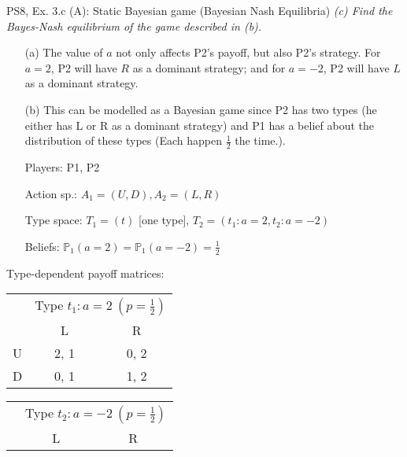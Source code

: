 \begin{frame}{PS8, Ex. 3.c (A): Static Bayesian game (Bayesian Nash Equilibria)}
    \textit{(c) Find the Bayes-Nash equilibrium of the game described in (b).}
    \vspace{-8pt}
    \begin{multicols}{2}
      \begin{itemize}
      \item[(a)] The value of $a$ not only affects P2's payoff, but also P2's strategy. For $a=2$, P2 will have $R$ as a dominant strategy; and for $a=-2$, P2 will have $L$ as a dominant strategy.
      \item[(b)] This can be modelled as a Bayesian game since P2 has two types (he either has L or R as a dominant strategy) and P1 has a belief about the distribution of these types (Each happen $\frac{1}{2}$ the time.).
          \item[Players:] P1, P2
          \item[Action sp.:] $A_1=(U,D),A_2=(L,R)$
          \item[Type space:] $T_1=(t)$ [one type], $T_2=(t_1:a=2,t_2:a=-2)$
          \item[Beliefs:] $\mathbb{P}_1(a=2)=\mathbb{P}_1(a=-2)=\frac{1}{2}$
          \vfill\null\columnbreak
      \end{itemize}
      Type-dependent payoff matrices:
      \vspace{-8pt}
      \begin{table}
          \begin{tabular}{l|c|c|}
          \multicolumn{1}{c}{} & \multicolumn{2}{c}{Type $t_1:a=2\ (p=\frac{1}{2})$} \\
          \multicolumn{1}{c}{} & \multicolumn{1}{c}{L} & \multicolumn{1}{c}{R} \\\cline{2-3}
          U & 2, 1 & 0, 2 \\\cline{2-3}
          D & 0, 1 & 1, 2 \\\cline{2-3}
        \end{tabular}
      \end{table}
      \vspace{-8pt}
      \begin{table}
        \begin{tabular}{l|c|c|}
          \multicolumn{1}{c}{} & \multicolumn{2}{c}{Type $t_2:a=-2\ (p=\frac{1}{2})$} \\
          \multicolumn{1}{c}{} & \multicolumn{1}{c}{L} & \multicolumn{1}{c}{R} \\\cline{2-3}

\end{tabular}
\end{table}
\end{multicols}
\end{frame}
